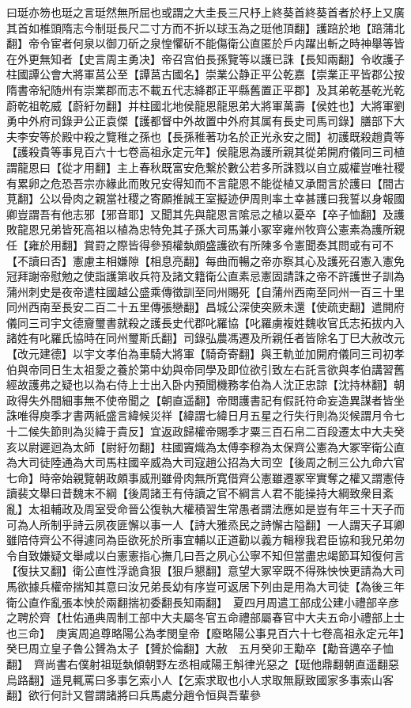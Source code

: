 曰珽亦笏也珽之言珽然無所屈也或謂之大圭長三尺杼上終葵首終葵首者於杼上又廣其首如椎頭隋志今制珽長尺二寸方而不折以球玉為之珽他頂翻】護踣於地【踣蒲北翻】帝令宦者何泉以御刀斫之泉惶懼斫不能傷衛公直匿於戶内躍出斬之時神舉等皆在外更無知者【史言周主勇决】帝召宫伯長孫覽等以護已誅【長知兩翻】令收護子柱國譚公會大將軍莒公至【譚莒古國名】崇業公静正平公乾嘉【崇業正平皆郡公按隋書帝紀随州有崇業郡而志不載五代志絳郡正平縣舊置正平郡】及其弟乾基乾光乾蔚乾祖乾威【蔚紆勿翻】并柱國北地侯龍恩龍恩弟大將軍萬壽【侯姓也】大將軍劉勇中外府司錄尹公正袁傑【護都督中外故置中外府其属有長史司馬司錄】膳部下大夫李安等於殿中殺之覽稚之孫也【長孫稚著功名於正光永安之間】初護既殺趙貴等【護殺貴等事見百六十七卷高祖永定元年】侯龍恩為護所親其從弟開府儀同三司植謂龍恩曰【從才用翻】主上春秋既富安危繋於數公若多所誅戮以自立威權豈唯社稷有累卵之危恐吾宗亦緣此而敗兄安得知而不言龍恩不能從植又承間言於護曰【間古莧翻】公以骨肉之親當社稷之寄願推誠王室擬迹伊周則率土幸甚護曰我誓以身報國卿豈謂吾有他志邪【邪音耶】又聞其先與龍恩言隂忌之植以憂卒【卒子恤翻】及護敗龍恩兄弟皆死高祖以植為忠特免其子孫大司馬兼小冢宰雍州牧齊公憲素為護所親任【雍於用翻】賞罸之際皆得參預權埶頗盛護欲有所陳多令憲聞奏其問或有可不【不讀曰否】憲慮主相嫌隙【相息亮翻】每曲而暢之帝亦察其心及護死召憲入憲免冠拜謝帝慰勉之使詣護第收兵符及諸文籍衛公直素忌憲固請誅之帝不許護世子訓為蒲州刺史是夜帝遣柱國越公盛乘傳徵訓至同州賜死【自蒲州西南至同州一百三十里同州西南至長安二百二十五里傳張戀翻】昌城公深使突厥未還【使疏吏翻】遣開府儀同三司宇文德齎璽書就殺之護長史代郡叱羅協【叱羅虜複姓魏收官氏志拓拔内入諸姓有叱羅氏協時在同州璽斯氏翻】司錄弘農馮遷及所親任者皆除名丁巳大赦改元【改元建德】以宇文孝伯為車騎大將軍【騎奇寄翻】與王軌並加開府儀同三司初孝伯與帝同日生太祖愛之養於第中幼與帝同學及即位欲引致左右託言欲與孝伯講習舊經故護弗之疑也以為右侍上士出入卧内預聞機務孝伯為人沈正忠諒【沈持林翻】朝政得失外間細事無不使帝聞之【朝直遥翻】帝閲護書記有假託符命妄造異謀者皆坐誅唯得庾季才書两紙盛言緯候災祥【緯謂七緯日月五星之行失行則為災候謂月令七十二候失節則為災緯于貴反】宜返政歸權帝賜季才粟三百石帛二百段遷太中大夫癸亥以尉遲迴為太師【尉紆勿翻】柱國竇熾為太傅李穆為太保齊公憲為大冢宰衛公直為大司徒陸通為大司馬柱國辛威為大司寇趙公招為大司空【後周之制三公九命六官七命】時帝始親覽朝政頗事威刑雖骨肉無所寛借齊公憲雖遷冢宰實奪之權又謂憲侍讀裴文舉曰昔魏末不綱【後周諸王有侍讀之官不綱言人君不能操持大綱致衆目紊亂】太祖輔政及周室受命晉公復執大權積習生常愚者謂法應如是豈有年三十天子而可為人所制乎詩云夙夜匪懈以事一人【詩大雅烝民之詩懈古隘翻】一人謂天子耳卿雖陪侍齊公不得遽同為臣欲死於所事宜輔以正道勸以義方輯穆我君臣協和我兄弟勿令自致嫌疑文舉咸以白憲憲指心撫几曰吾之夙心公寧不知但當盡忠竭節耳知復何言【復扶又翻】衛公直性浮詭貪狠【狠戶懇翻】意望大冢宰既不得殊怏怏更請為大司馬欲據兵權帝揣知其意曰汝兄弟長幼有序豈可返居下列由是用為大司徒【為後三年衛公直作亂張本怏於兩翻揣初委翻長知兩翻】　夏四月周遣工部成公建小禮部辛彦之聘於齊【杜佑通典周制工部中大夫屬冬官五命禮部屬春官中大夫五命小禮部上士也三命】　庚寅周追尊略陽公為孝閔皇帝【廢略陽公事見百六十七卷高祖永定元年】　癸巳周立皇子魯公贇為太子【贇於倫翻】大赦　五月癸卯王勱卒【勱音邁卒子恤翻】　齊尚書右僕射祖珽埶傾朝野左丞相咸陽王斛律光惡之【珽他鼎翻朝直遥翻惡烏路翻】遥見輒罵曰多事乞索小人【乞索求取也小人求取無厭致國家多事索山客翻】欲行何計又嘗謂諸將曰兵馬處分趙令恒與吾輩參